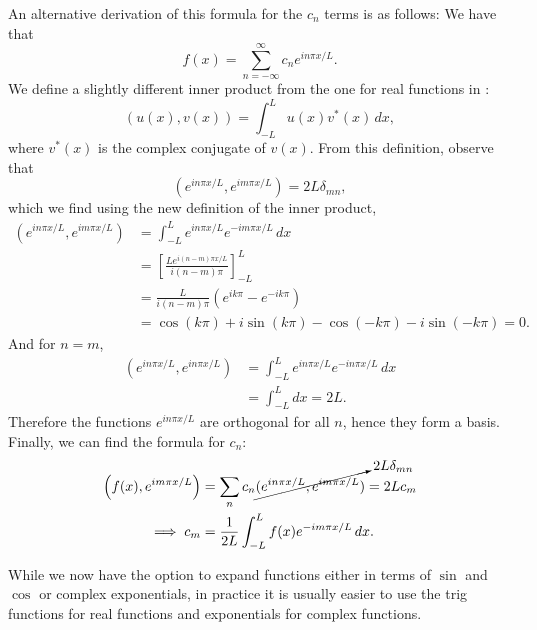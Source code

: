 An alternative derivation of this formula for the $c_n$ terms is as follows: We have that
\[
f(x) = \sum_{n=-\infty}^{\infty} c_n e^{in\pi x/L}.
\]
We define a slightly different inner product from the one for real functions in :
\begin{equation}\label{eq:innerprodcomplex}
	\left(u(x), v(x)\right) = \int_{-L}^L u(x)v^*(x) \,dx,
\end{equation}
where $v^*(x)$ is the complex conjugate of $v(x)$. From this definition, observe that
\[
\left(e^{in\pi x/L}, e^{im\pi x/L}\right) = 2L\delta_{mn},
\]
which we find using the new definition of the inner product,
\begin{align*}
	\left(e^{in\pi x/L}, e^{im\pi x/L}\right) &= \int_{-L}^L e^{in\pi x/L}e^{-im\pi x/L} \,dx \tag{$n \neq m$} \\
	&= \left[ \frac{Le^{i(n-m)\pi x/L}}{i(n-m)\pi} \right]_{-L}^L \\
	&= \frac{L}{i(n-m)\pi} \left(e^{ik\pi} - e^{-ik\pi}\right) \tag{$k=n-m$} \\
	&= \cos(k\pi) + i\sin(k\pi) - \cos(-k\pi) - i\sin(-k\pi) = 0.
\end{align*}
And for $n=m$,
\begin{align*}
	(e^{in\pi x/L}, e^{in\pi x/L}) &= \int_{-L}^L e^{in\pi x/L}e^{-in\pi x/L} \,dx \\
	&= \int_{-L}^L dx = 2L.
\end{align*}
Therefore the functions $e^{in\pi x/L}$ are orthogonal for all $n$, hence they form a basis. Finally, we can find the formula for $c_n$:
\begin{align*}
	\left(f(x), e^{im\pi x/L}\right) &= \sum_n c_n \cancelto{2L\delta_{mn}}{(e^{in\pi x/L}, e^{im\pi x/L})} = 2L c_m \\
	\implies c_m &= \frac{1}{2L} \int_{-L}^L f(x) e^{-im\pi x/L} \,dx.
\end{align*}

\begin{remark}
	While we now have the option to expand functions either in terms of $\sin$ and $\cos$ or complex exponentials, in practice it is usually easier to use the trig functions for real functions and exponentials for complex functions.
\end{remark}

